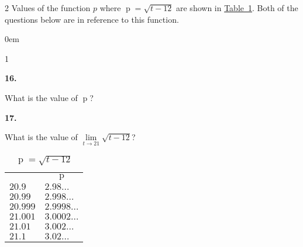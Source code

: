 \documentclass[12pt,]{book}
\theoremstyle{plain}
\theoremstyle{definition}
\numberwithin{equation}{section}
\newcommand{\hrulemedium}{\noalign{\hrule height 0.07em}}
\newcommand{\hrulethick} {\noalign{\hrule height 0.11em}}
\newenvironment{exercisegroup}%
{\medskip\noindent}%
{\par\bigskip}%
\newlength{\exercisegroupindent}%
\newlength{\exercisegroupitemwidth}%
\newenvironment{exercisegrouplist}%
{\vspace{-\partopsep}%
\begin{adjustwidth}{\exercisegroupindent}{0em}}%
{\end{adjustwidth}%
\vspace{-\partopsep}%
\vspace{\baselineskip}}%
\newenvironment{exercisegroupbycol}[1]%
{\begin{exercisegrouplist}%
\vspace{-\multicolsep}%
\begin{multicols}{#1}%
\setlength{\parindent}{0em}%
\setlength{\exercisegroupitemwidth}{\linewidth}}%
{\end{multicols}%
\vspace{-\multicolsep}%
\end{exercisegrouplist}}%
\newenvironment{exercisegroupitem}[1]%
{\begin{minipage}[t]{\exercisegroupitemwidth}
\vspace{0pt}%
{\bfseries#1}%
\rule{0pt}{\baselineskip}}{\strut%
\end{minipage}%
\hspace{\columnsep}}%
\providecommand\phantomsection{}
\newcommand{\fe}[2]{\mathop{{#1}{\left(#2\right)}}}
\begin{document}
\begin{multicols}{2}
\begin{exercisegroup}%
Values of the function \(p\) where \(\fe{p}{t}=\sqrt{t-12}\) are shown in \hyperref[table-square-root-values]{Table~\ref*{table-square-root-values}}. Both of the questions below are in reference to this function.%
\par
\begin{exercisegroupbycol}{1}%
\begin{exercisegroupitem}{16. }\phantomsection\hypertarget{exercise-61}{\null}
What is the value of \(\fe{p}{21}\)?%
\end{exercisegroupitem}%
\par%
\begin{exercisegroupitem}{17. }\phantomsection\hypertarget{exercise-62}{\null}
What is the value of \(\lim\limits_{t\to21}\sqrt{t-12}\)?%
\end{exercisegroupitem}%
\par%
\end{exercisegroupbycol}%
\end{exercisegroup}%
\vfill
\columnbreak
\begin{table}
\centering
\caption{\(\fe{p}{t}=\sqrt{t-12}\)\label{table-square-root-values}}
\begin{tabular}{ll}\hrulethick
\multicolumn{1}{c}{\(t\)}&\multicolumn{1}{c}{\(\fe{p}{t}\)}\\\hrulemedium
\(20.9\)&\(2.98\ldots\)\\
\(20.99\)&\(2.998\ldots\)\\
\(20.999\)&\(2.9998\ldots\)\\
\(21.001\)&\(3.0002\ldots\)\\
\(21.01\)&\(3.002\ldots\)\\
\(21.1\)&\(3.02\ldots\)
\end{tabular}
\end{table}
\end{multicols}%
\end{document}
